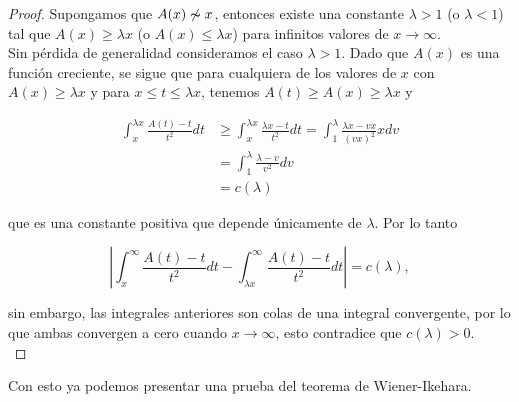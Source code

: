 \begin{proof}
    Supongamos que $A(x)\not\thicksim x$, entonces existe una constante $\lambda>1$ (o $\lambda<1$) tal que $A(x)\geq \lambda x$ (o $A(x)\leq \lambda x$) para infinitos valores de $x\to \infty$.\\

    Sin pérdida de generalidad consideramos el caso \( \lambda > 1 \). Dado que \( A(x) \) es una función creciente, se sigue que para cualquiera de los valores de \( x \) con \( A(x) \geq \lambda x \) y para \( x \leq t \leq \lambda x \), tenemos \( A(t) \geq A(x) \geq \lambda x \) y  

\[
\begin{aligned}
\int_x^{\lambda x} \frac{A(t)-t}{t^2} d t & \geq \int_x^{\lambda x} \frac{\lambda x-t}{t^2} d t = \int_1^\lambda \frac{\lambda x-v x}{(v x)^2} x d v \\
& = \int_1^\lambda \frac{\lambda-v}{v^2} d v\\
&=c(\lambda)
\end{aligned}
\]

que es una constante positiva que depende únicamente de \( \lambda \). Por lo tanto  

\[
\left|\int_x^{\infty} \frac{A(t)-t}{t^2} d t - \int_{\lambda x}^{\infty} \frac{A(t)-t}{t^2} d t\right| =c(\lambda),
\]

sin embargo, las integrales anteriores son colas de una integral convergente, por lo que ambas convergen a cero cuando \( x \rightarrow \infty \), esto contradice que $c(\lambda)>0$.\\
\end{proof}

Con esto ya podemos presentar una prueba del teorema de Wiener-Ikehara.\\

